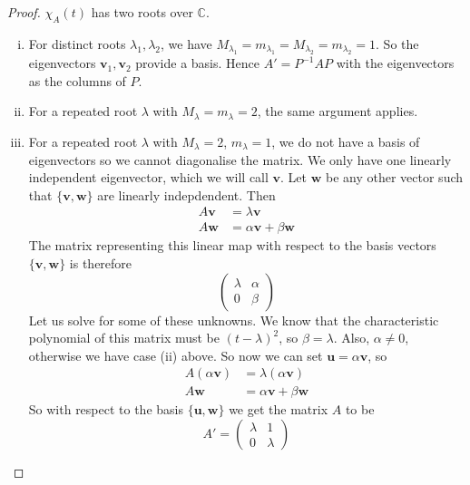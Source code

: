 \documentclass{article}
\begin{document}
\begin{proof}
	$\chi_A(t)$ has two roots over $\mathbb C$.
	\begin{enumerate}[(i)]
		\item For distinct roots $\lambda_1, \lambda_2$, we have $M_{\lambda_1} = m_{\lambda_1} = M_{\lambda_2} = m_{\lambda_2} = 1$. So the eigenvectors $\bm v_1, \bm v_2$ provide a basis. Hence $A' = P^{-1}AP$ with the eigenvectors as the columns of $P$.
		\item For a repeated root $\lambda$ with $M_\lambda = m_\lambda = 2$, the same argument applies.
		\item For a repeated root $\lambda$ with $M_\lambda = 2$, $m_\lambda = 1$, we do not have a basis of eigenvectors so we cannot diagonalise the matrix. We only have one linearly independent eigenvector, which we will call $\bm v$. Let $\bm w$ be any other vector such that $\{ \bm v, \bm w \}$ are linearly indepdendent. Then
		      \begin{align*}
			      A\bm v & = \lambda \bm v              \\
			      A\bm w & = \alpha \bm v + \beta \bm w
		      \end{align*}
		      The matrix representing this linear map with respect to the basis vectors $\{ \bm v, \bm w \}$ is therefore
		      \[ \begin{pmatrix}
				      \lambda & \alpha \\
				      0       & \beta
			      \end{pmatrix} \]
		      Let us solve for some of these unknowns. We know that the characteristic polynomial of this matrix must be $(t - \lambda)^2$, so $\beta = \lambda$. Also, $\alpha \neq 0$, otherwise we have case (ii) above. So now we can set $\bm u = \alpha \bm v$, so
		      \begin{align*}
			      A(\alpha \bm v) & = \lambda (\alpha \bm v)     \\
			      A\bm w          & = \alpha \bm v + \beta \bm w
		      \end{align*}
		      So with respect to the basis $\{ \bm u, \bm w \}$ we get the matrix $A$ to be
		      \[ A' = \begin{pmatrix}
				      \lambda & 1       \\
				      0       & \lambda
			      \end{pmatrix} \]
	\end{enumerate}
\end{proof}
\end{document}
